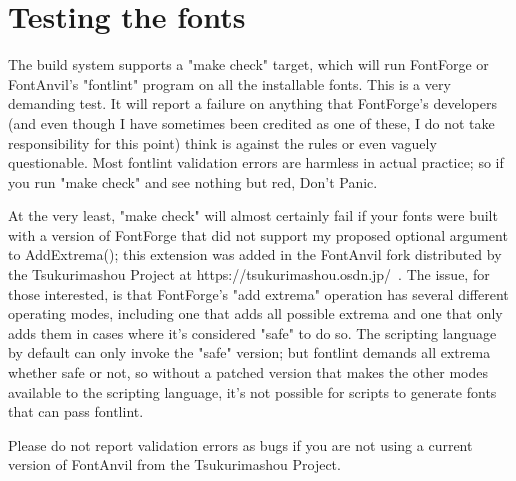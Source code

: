 \documentclass{article}
\begin{document}
\section{Testing the fonts}

The build system supports a "make check" target, which will run FontForge or
FontAnvil's "fontlint" program on all the installable fonts.  This is a very
demanding test.  It will report a failure on anything that FontForge's
developers (and even though I have sometimes been credited as one of these,
I do not take responsibility for this point) think is against the rules or
even vaguely questionable.  Most fontlint validation errors are harmless in
actual practice; so if you run "make check" and see nothing but red, Don't
Panic.

At the very least, "make check" will almost certainly fail if your fonts
were built with a version of FontForge that did not support my proposed
optional argument to AddExtrema(); this extension was added in the FontAnvil
fork distributed by the Tsukurimashou Project at
https://tsukurimashou.osdn.jp/~.  The issue, for those interested, is that
FontForge's "add extrema" operation has several different operating modes,
including one that adds all possible extrema and one that only adds them in
cases where it's considered "safe" to do so.  The scripting language by
default can only invoke the "safe" version; but fontlint demands all extrema
whether safe or not, so without a patched version that makes the other modes
available to the scripting language, it's not possible for scripts to
generate fonts that can pass fontlint.

Please do not report validation errors as bugs if you are not using a
current version of FontAnvil from the Tsukurimashou Project.
\end{document}

